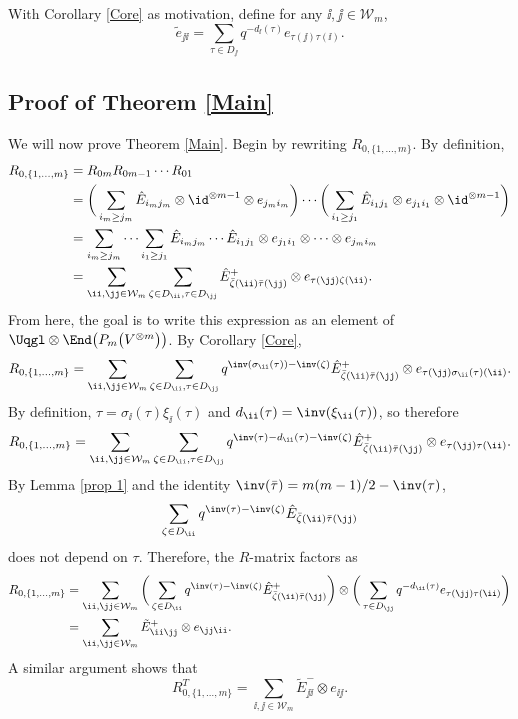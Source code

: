 With Corollary \ref{Core} as motivation, define for any $\ii,\jj \in \mathcal{W}_m$,
\[
\tilde{e}_{\jj \ii} = \sum_{\tau \in D_{\jj}} q^{-d_{\ii}(\tau)}e_{\tau(\jj)\tau(\ii)} .
\]

\subsection{Proof of Theorem \ref{Main}}
We will now prove Theorem \ref{Main}. Begin by rewriting $R_{0,\{1,\dots,m\}}$. By definition,
\begin{align*}
R_{0,\{1,\dots,m\}} &= R_{0m}R_{0m-1}\cdots R_{01} \\
&=\bigg( \sum_{i_m \geq j_m} \hat{E}_{i_mj_m} \otimes \id^{\otimes m-1} \otimes e_{j_mi_m} \bigg) \cdots \bigg(\sum_{i_1\geq j_1}\hat{E}_{i_1j_1}\otimes e_{j_1i_1} \otimes \id^{\otimes m-1}\bigg)
\\&= \sum_{i_m \geq j_m} \cdots \sum_{i_1\geq j_1} \hat{E}_{i_mj_m} \cdots \hat{E}_{i_1j_1} \otimes e_{j_1i_1} \otimes \dots \otimes e_{j_mi_m} \\
&= \sum_{\ii,\jj \in \mathcal{W}_m } \sum_{\zeta \in D_{\ii},\tau \in D_{\jj}}\hat{E}_{\bar{\zeta}(\ii)\bar{\tau}(\jj)}^{+} \otimes e_{\tau(\jj)\zeta(\ii)}.
\end{align*}
From here, the goal is to write this expression as an element of $\Uqgl \otimes \End\big(P_m\big(V^{\otimes m}\big)\big)$. By Corollary \ref{Core},
\[
R_{0,\{1,\dots,m\}} = \sum_{\ii,\jj \in \mathcal{W}_m } \sum_{\zeta \in D_{\ii},\tau \in D_{\jj}}q^{\inv(\sigma_{\ii}(\tau)) -\inv(\zeta)}\hat{E}^+_{\bar{\zeta}(\ii)\bar{\tau}(\jj)} \otimes e_{\tau(\jj)\sigma_{\ii}(\tau)(\ii)}.
\]
By definition, $\tau = \sigma_{\ii}(\tau) \xi_{\ii}(\tau)$ and $d_{\ii}(\tau) = \inv(\xi_{\ii}(\tau))$, so therefore
\[
R_{0,\{1,\dots,m\}} = \sum_{\ii,\jj \in \mathcal{W}_m } \sum_{\zeta \in D_{\ii},\tau \in D_{\jj}}q^{\inv(\tau) -d_{\ii}(\tau) -\inv(\zeta)}\hat{E}^+_{\bar{\zeta}(\ii)\bar{\tau}(\jj)} \otimes e_{\tau(\jj)\tau(\ii)}.
\]
By Lemma \ref{prop 1} and the identity $\inv(\bar{\tau}) = m(m-1)/2 - \inv(\tau)$,
\[
\sum_{\zeta \in D_{\ii}}q^{\inv(\tau) -\inv(\zeta)}\hat{E}_{\bar{\zeta}(\ii)\bar{\tau}(\jj)}
\]
does not depend on $\tau$. Therefore, the $R$-matrix factors as
\begin{align*}
R_{0,\{1,\dots,m\} } &= \sum_{\ii,\jj \in \mathcal{W}_m } \bigg( \sum_{\zeta \in D_{\ii}}q^{\inv(\tau) -\inv(\zeta)}\hat{E}^+_{\bar{\zeta}(\ii)\bar{\tau}(\jj)} \bigg) \otimes \bigg( \sum_{\tau \in D_{\jj}} q^{-d_{\ii}(\tau)}e_{\tau(\jj)\tau(\ii)} \bigg) \\
&= \sum_{\ii,\jj \in \mathcal{W}_m } \tilde{E}_{\ii\jj}^+ \otimes e_{\jj\ii}.
\end{align*}
A similar argument shows that
\[
R^T_{0,\{1,\dots,m\}}=\sum_{\ii,\jj \in \mathcal{W}_m } \tilde{E}^-_{\jj\ii} \otimes e_{\ii\jj}.
\]

